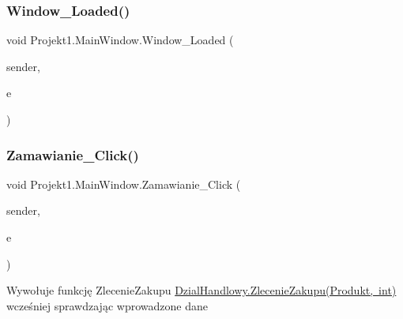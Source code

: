 \mbox{\label{class_projekt1_1_1_main_window_a3948b116ee03c37310b5d5ae40d5e897}} 
\subsubsection{\texorpdfstring{Window\_Loaded()}{Window\_Loaded()}}
{\footnotesize\ttfamily void Projekt1.\+Main\+Window.\+Window\+\_\+\+Loaded (\begin{DoxyParamCaption}\item[{object}]{sender,  }\item[{Routed\+Event\+Args}]{e }\end{DoxyParamCaption})\hspace{0.3cm}{\ttfamily [private]}}

\mbox{\label{class_projekt1_1_1_main_window_a9891b3bd97907aab93904768d2ce1156}} 
\subsubsection{\texorpdfstring{Zamawianie\_Click()}{Zamawianie\_Click()}}
{\footnotesize\ttfamily void Projekt1.\+Main\+Window.\+Zamawianie\+\_\+\+Click (\begin{DoxyParamCaption}\item[{object}]{sender,  }\item[{Routed\+Event\+Args}]{e }\end{DoxyParamCaption})\hspace{0.3cm}{\ttfamily [private]}}



Wywołuje funkcję Zlecenie\+Zakupu \mbox{\hyperlink{class_projekt1_1_1_dzial_handlowy_acd312cb8369482f492936c642ef5170f}{Dzial\+Handlowy.\+Zlecenie\+Zakupu(\+Produkt, int)}} wcześniej sprawdzając wprowadzone dane 

\mbox{\label{class_projekt1_1_1_main_window_ae4f4e8c3ba5f2c9278e04ab5317d0c70}} 
